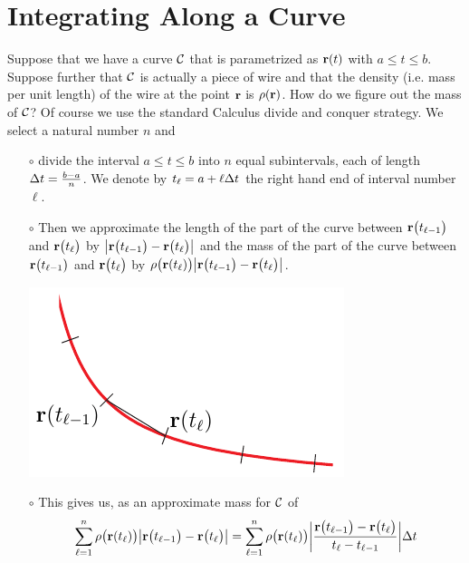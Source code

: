\section{Integrating Along a Curve}\label{sec:lineIntegral}
Suppose that we have a curve $\mathcal{C}$ that is parametrized as $\mathbf{r}(t)$
with $a\le t\le b$. Suppose further that $\mathcal{C}$ is actually a piece of wire 
and that the density (i.e. mass per unit length) of the wire at the point $\mathbf{r}$ 
is $\rho(\mathbf{r})$. How do we figure out the mass of $\mathcal{C}$? Of course 
we use the standard Calculus divide and conquer strategy. We select a 
natural number $n$ and
\begin{itemize}\itemsep1pt \parskip0pt  %
\item[$\circ$]
divide the interval $a\le t\le b$ into $n$ equal subintervals, 
each of length $\Delta t=\frac{b-a}{n}$. We denote by
$t_\ell = a + \ell\Delta t$ the right hand end of interval number $\ell$.
\item[$\circ$]
Then we approximate the length of the part of the curve between
$\mathbf{r}\big(t_{\ell-1}\big)$ and $\mathbf{r}\big(t_\ell\big)$ by
$\big|\mathbf{r}\big(t_{\ell-1}\big)-\mathbf{r}\big(t_\ell\big)\big|$ and the mass
of the part of the curve between $\mathbf{r}\big(t_{\ell-1}\big)$ 
and $\mathbf{r}\big(t_\ell\big)$ by $\rho\big(\mathbf{r}(t_\ell)\big)
\big|\mathbf{r}\big(t_{\ell-1}\big)-\mathbf{r}\big(t_\ell\big)\big|$.
\begin{nfig}
\begin{center}
    \includegraphics{parCurveL.pdf}
\end{center}
\end{nfig}


\item[$\circ$]
This gives us, as an approximate mass for $\mathcal{C}$ of
\begin{equation*}
\sum_{\ell=1}^n \rho\big(\mathbf{r}(t_\ell)\big)
    \big|\mathbf{r}\big(t_{\ell-1}\big)-\mathbf{r}\big(t_\ell\big)\big|
=\sum_{\ell=1}^n \rho\big(\mathbf{r}(t_\ell)\big)
   \bigg|\frac{\mathbf{r}\big(t_{\ell-1}\big)-\mathbf{r}\big(t_\ell\big)}
                          {t_\ell-t_{\ell-1}}\bigg|\Delta t
\end{equation*}
\end{itemize}
